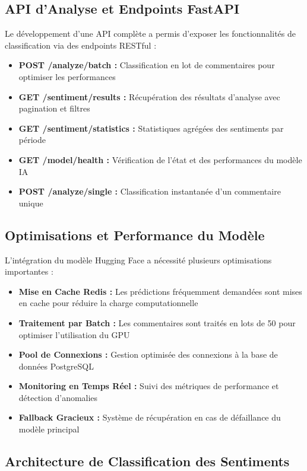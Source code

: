 \subsection{API d'Analyse et Endpoints FastAPI}

Le développement d'une API complète a permis d'exposer les fonctionnalités de classification via des endpoints RESTful :

\begin{itemize}
    \item \textbf{POST /analyze/batch :} Classification en lot de commentaires pour optimiser les performances
    \item \textbf{GET /sentiment/results :} Récupération des résultats d'analyse avec pagination et filtres
    \item \textbf{GET /sentiment/statistics :} Statistiques agrégées des sentiments par période
    \item \textbf{GET /model/health :} Vérification de l'état et des performances du modèle IA
    \item \textbf{POST /analyze/single :} Classification instantanée d'un commentaire unique
\end{itemize}

\subsection{Optimisations et Performance du Modèle}

L'intégration du modèle Hugging Face a nécessité plusieurs optimisations importantes :

\begin{itemize}
    \item \textbf{Mise en Cache Redis :} Les prédictions fréquemment demandées sont mises en cache pour réduire la charge computationnelle
    \item \textbf{Traitement par Batch :} Les commentaires sont traités en lots de 50 pour optimiser l'utilisation du GPU
    \item \textbf{Pool de Connexions :} Gestion optimisée des connexions à la base de données PostgreSQL
    \item \textbf{Monitoring en Temps Réel :} Suivi des métriques de performance et détection d'anomalies
    \item \textbf{Fallback Gracieux :} Système de récupération en cas de défaillance du modèle principal
\end{itemize}

\subsection{Architecture de Classification des Sentiments}

